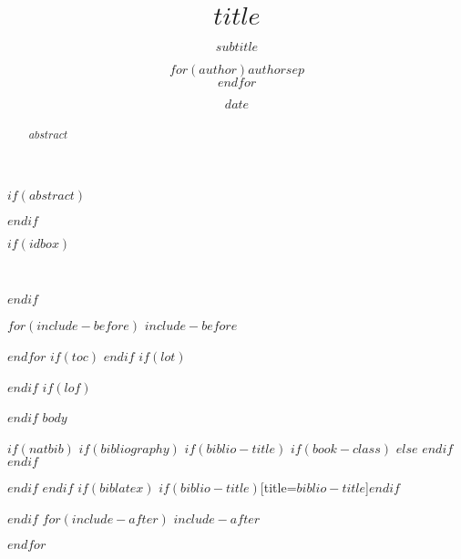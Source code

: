 \documentclass[$if(fontsize)$$fontsize$,$endif$$if(lang)$$lang$,$endif$$if(papersize)$$papersize$,$endif$$for(classoption)$$classoption$$sep$,$endfor$]{$documentclass$}
\title{$title$}
\title{}
\subtitle{$subtitle$}
\author{$for(author)$$author$$sep$ \\ $endfor$}
\author{}
\date{$date$}
\date{}
\begin{document}
\maketitle
$if(abstract)$
\begin{abstract}
$abstract$
\end{abstract}
$endif$

$if(idbox)$
\begin{mdframed}[roundcorner = 2pt, linewidth = 1pt]
\vspace{0.1in}
\\[12pt]
\vspace{0.2in}
\end{mdframed}
$endif$

$for(include-before)$
$include-before$

$endfor$
$if(toc)$
{
\hypersetup{linkcolor=$if(toccolor)$$toccolor$$else$black$endif$}
\setcounter{tocdepth}{$toc-depth$}
\tableofcontents
}
$endif$
$if(lot)$
\listoftables
$endif$
$if(lof)$
\listoffigures
$endif$
$body$

$if(natbib)$
$if(bibliography)$
$if(biblio-title)$
$if(book-class)$
\renewcommand\bibname{$biblio-title$}
$else$
\renewcommand\refname{$biblio-title$}
$endif$
$endif$


$endif$
$endif$
$if(biblatex)$
\printbibliography$if(biblio-title)$[title=$biblio-title$]$endif$

$endif$
$for(include-after)$
$include-after$

$endfor$
\end{document}
